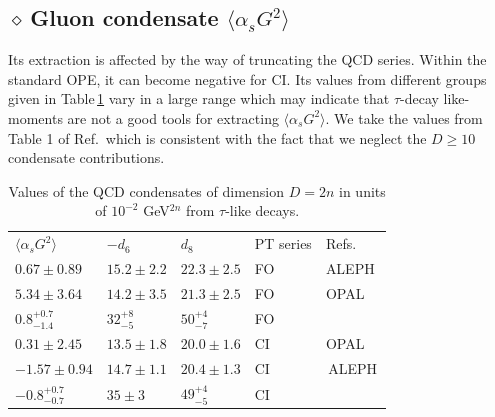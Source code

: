 \documentclass[review]{elsarticle}
\def\la{\langle}
\def\ra{\rangle}
\def\d{$\diamond~$}
\begin{document}
  \subsection*{\d Gluon condensate $\la\alpha_s G^2\ra$ }
   Its extraction is affected by the way of truncating the QCD series. Within the standard OPE, it can become negative for CI. Its values from different groups given in Table\,\ref{tab:g2} vary in a large range
  which may indicate that $\tau$-decay like-moments  are not a good tools for extracting $\la \alpha_s G^2\ra$.  We take the values from Table 1 of Ref.\,\cite{PICH1} which is consistent with the fact that we neglect the $D\geq 10$ condensate contributions.
   
      {\normalsize
\begin{table}[hbt]
\setlength{\tabcolsep}{1.2pc}
  \begin{center}
    {%
  \begin{tabular}{lllll}

&\\
\hline
\hline
$\la\alpha_s G^2\ra$&$-d_6$&$d_8$&PT series & Refs.\\
 \hline 
$0.67\pm 0.89$&$15.2\pm 2.2$&$22.3\pm 2.5$&    {\rm FO}&{\rm ALEPH}\,\cite{ALEPH}\\
$5.34\pm 3.64$&$14.2\pm 3.5$&$21.3\pm 2.5$&            {\rm FO}&{\rm OPAL}\,\cite{OPAL}\\
 $0.8^{+0.7}_{-1.4}$&$32^{+8}_{-5}$&$50^{+4}_{-7}$&{\rm FO}&\,\cite{PICH1}\\
$0.31\pm 2.45$&$13.5\pm 1.8$&$20.0\pm 1.6$&       {\rm CI}&{\rm OPAL}\,\cite{OPAL}\\
$-1.57\pm0.94$&$14.7\pm 1.1$&$20.4\pm 1.3$&{\rm CI}&\,{\rm ALEPH}\,\cite{DAVIER}\\
$-0.8^{+0.7}_{-0.7}$&$35\pm 3$&$49 ^{+4}_{-5}$&  {\rm CI}&\,\cite{PICH1}\\
   \hline\hline
\end{tabular}}
 \caption{ Values of the QCD condensates of dimension $D=2n$ in units of $10^{-2}$ GeV$^{2n}$ from $\tau$-like decays.  }\label{tab:g2} 
 \end{center}
\end{table}
} 
\end{document}
